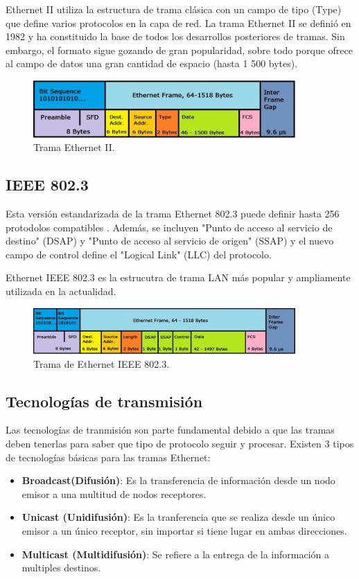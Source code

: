 \documentclass[12pt]{report}
\begin{document}
	Ethernet II utiliza la estructura de trama clásica con un campo de tipo (Type) que define varios protocolos en la capa de red. La trama Ethernet II se definió en 1982 y ha constituido la base de todos los desarrollos posteriores de tramas. Sin embargo, el formato sigue gozando de gran popularidad, sobre todo porque ofrece al campo de datos una gran cantidad de espacio (hasta 1 500 bytes).
	
	\begin{figure}[!h]
		\centering
		\includegraphics[width=10cm]{images/etii_structure.jpg}
		\caption{Trama Ethernet II.}
	\end{figure}

	\subsection*{IEEE 802.3}
	Esta versión estandarizada de la trama Ethernet 802.3 puede definir hasta 256 protodolos compatibles . Además, se incluyen "Punto de acceso al servicio de destino" (DSAP) y "Punto de acceso al servicio de origen" (SSAP) y el nuevo campo de control define el "Logical Link" (LLC) del protocolo.
	
	Ethernet IEEE 802.3 es la estrucutra de trama LAN  más popular y ampliamente utilizada en la actualidad.
	\cite{web:ethernet}
	
	\begin{figure}[!h]
		\centering
		\includegraphics[width=10cm]{images/eth8023.jpg}
		\caption{Trama de Ethernet IEEE 802.3.}
	\end{figure}

	\subsection{Tecnologías de transmisión}
	Las tecnologías de tranmisión son parte fundamental debido a que las tramas deben tenerlas para saber que tipo de protocolo seguir y procesar. Existen 3 tipos de tecnologías básicas para las tramas Ethernet:
	
	\begin{itemize}
		\item \textbf{Broadcast(Difusión)}: Es la transferencia de información desde un nodo emisor a una multitud de nodos receptores. \cite{web:broadcast}
		\item \textbf{Unicast (Unidifusión)}: Es la tranferencia que se realiza desde un único emisor a un único receptor, sin importar si tiene lugar en ambas direcciones. \cite{web:unicast}
		\item \textbf{Multicast (Multidifusión)}: Se refiere a la entrega de la información a multiples destinos. \cite{web:multicast}
	\end{itemize}
\end{document}
